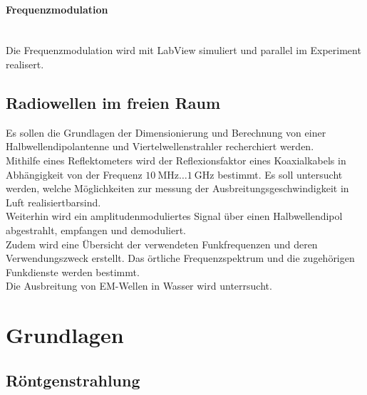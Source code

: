 \documentclass[a4paper,twoside,final]{article}
\begin{document}
\paragraph{Frequenzmodulation}$~$\\
Die Frequenzmodulation wird mit LabView simuliert und parallel im Experiment realisert.

\subsection{Radiowellen im freien Raum}
Es sollen die Grundlagen der Dimensionierung und Berechnung von einer Halbwellendipolantenne und Viertelwellenstrahler recherchiert werden.\\
Mithilfe eines Reflektometers wird der Reflexionsfaktor eines Koaxialkabels in Abhängigkeit von der Frequenz $\SI{10}{\mega\hertz}\hdots\SI{1}{\giga\hertz}$ bestimmt. Es soll untersucht werden, welche Möglichkeiten zur messung der Ausbreitungsgeschwindigkeit in Luft realisiertbarsind.\\
Weiterhin wird ein amplitudenmoduliertes Signal über einen Halbwellendipol abgestrahlt, empfangen und demoduliert. \\
Zudem wird eine Übersicht der verwendeten Funkfrequenzen und deren Verwendungszweck erstellt. Das örtliche Frequenzspektrum und die zugehörigen Funkdienste werden bestimmt.\\
Die Ausbreitung von EM-Wellen in Wasser wird unterrsucht.


\newpage
\section{Grundlagen} \label{sec:Grundlagen}

\subsection{Röntgenstrahlung}
\end{document}

